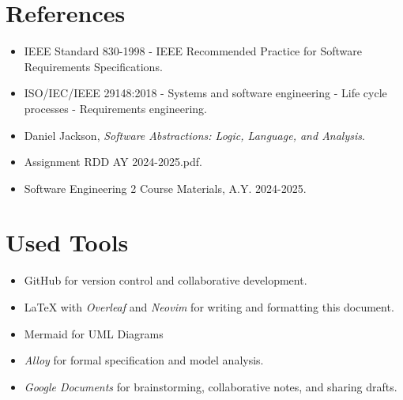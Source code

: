 \section{References}
\label{sec:references}%

\begin{itemize}
    \item IEEE Standard 830-1998 - IEEE Recommended Practice for Software Requirements Specifications.
    \item ISO/IEC/IEEE 29148:2018 - Systems and software engineering - Life cycle processes - Requirements engineering.
    \item Daniel Jackson, \textit{Software Abstractions: Logic, Language, and Analysis}.
    \item Assignment RDD AY 2024-2025.pdf.
    \item Software Engineering 2 Course Materials, A.Y. 2024-2025.
\end{itemize}

\section{Used Tools}
\label{sec:used_tools}%
\begin{itemize}
    \item GitHub for version control and collaborative development.
    \item \LaTeX{} with \textit{Overleaf} and \textit{Neovim} for writing and formatting this document.
    \item Mermaid for UML Diagrams
    \item \textit{Alloy} for formal specification and model analysis.
    \item \textit{Google Documents} for brainstorming, collaborative notes, and sharing drafts.
\end{itemize}
